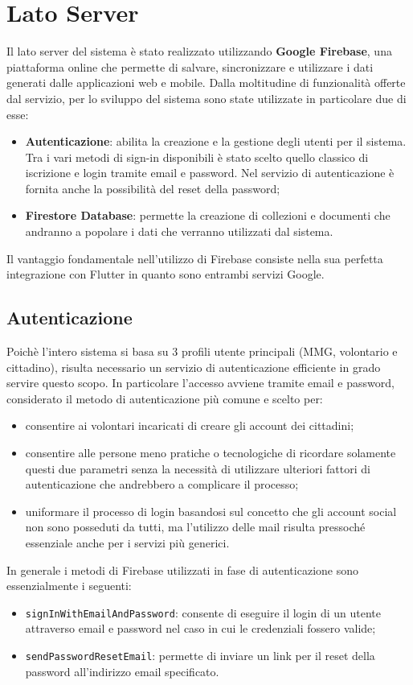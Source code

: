 \documentclass[12pt,a4paper,twoside,openright,titlepage]{book}
\begin{document}
\section{Lato Server}
Il lato server del sistema è stato realizzato utilizzando \textbf{Google Firebase}, una piattaforma online che permette di salvare, sincronizzare e utilizzare i dati generati dalle applicazioni web e mobile. Dalla moltitudine di funzionalità offerte dal servizio, per lo sviluppo del sistema sono state utilizzate in particolare due di esse:
\begin{itemize}
\item \textbf{Autenticazione}: abilita la creazione e la gestione degli utenti per il sistema. Tra i vari metodi di sign-in disponibili è stato scelto quello classico di iscrizione e login tramite email e password. Nel servizio di autenticazione è fornita anche la possibilità del reset della password;
\item \textbf{Firestore Database}: permette la creazione di collezioni e documenti che andranno a popolare i dati che verranno utilizzati dal sistema.
\end{itemize}
Il vantaggio fondamentale nell'utilizzo di Firebase consiste nella sua perfetta integrazione con Flutter in quanto sono entrambi servizi Google.

\subsection{Autenticazione}
Poichè l'intero sistema si basa su 3 profili utente principali (MMG, volontario e cittadino), risulta necessario un servizio di autenticazione efficiente in grado servire questo scopo. In particolare l'accesso avviene tramite email e password, considerato il metodo di autenticazione più comune e scelto per:
\begin{itemize}
\item consentire ai volontari incaricati di creare gli account dei cittadini;
\item consentire alle persone meno pratiche o tecnologiche di ricordare solamente questi due parametri senza la necessità di utilizzare ulteriori fattori di autenticazione che andrebbero a complicare il processo;
\item uniformare il processo di login basandosi sul concetto che gli account social non sono posseduti da tutti, ma l'utilizzo delle mail risulta pressoché essenziale anche per i servizi più generici.
\end{itemize}
In generale i metodi di Firebase utilizzati in fase di autenticazione sono essenzialmente i seguenti:
\begin{itemize}
\item \texttt{signInWithEmailAndPassword}: consente di eseguire il login di un utente attraverso email e password nel caso in cui le credenziali fossero valide;
\item \texttt{sendPasswordResetEmail}: permette di inviare un link per il reset della password all'indirizzo email specificato.
\end{itemize}
\end{document}
